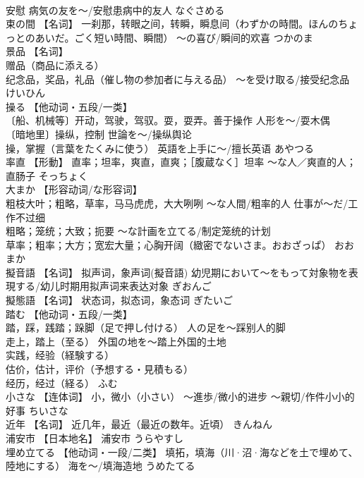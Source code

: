 \documentclass[8pt]{extreport}
\begin{document}
\begin{CJK}{UTF8}{min}
\\	安慰 病気の友を～/安慰患病中的友人	なぐさめる	
\\	束の間	【名词】 一刹那，转眼之间，转瞬，瞬息间（わずかの時間。ほんのちょっとのあいだ。ごく短い時間、瞬間） ～の喜び/瞬间的欢喜	つかのま	
\\	景品	【名词】 
\\	赠品（商品に添える） 
\\	纪念品，奖品，礼品（催し物の参加者に与える品） ～を受け取る/接受纪念品	けいひん	
\\	操る	【他动词・五段/一类】 
\\	〔船、机械等〕开动，驾驶，驾驭。耍，耍弄。善于操作 人形を～/耍木偶 
\\	〔暗地里〕操纵，控制 世論を～/操纵舆论 
\\	操，掌握（言葉をたくみに使う） 英語を上手に～/擅长英语	あやつる	
\\	率直	【形動】 直率；坦率，爽直，直爽；［腹蔵なく］坦率 ～な人／爽直的人；直肠子	そっちょく	
\\	大まか	【形容动词/な形容词】 
\\	粗枝大叶；粗略，草率，马马虎虎，大大咧咧 ～な人間/粗率的人 仕事が～だ/工作不过细 
\\	粗略；笼统；大致；扼要 ～な計画を立てる/制定笼统的计划 
\\	草率；粗率；大方；宽宏大量；心胸开阔（緻密でないさま。おおざっぱ）	おおまか	
\\	擬音語	【名词】 拟声词，象声词(擬音語) 幼児期において～をもって対象物を表現する/幼儿时期用拟声词来表达对象	ぎおんご	
\\	擬態語	【名词】 状态词，拟态词，象态词	ぎたいご	
\\	踏む	【他动词・五段/一类】 
\\	踏，踩，践踏；跺脚（足で押し付ける） 人の足を～踩别人的脚 
\\	走上，踏上（至る） 外国の地を～踏上外国的土地 
\\	实践，经验（経験する） 
\\	估价，估计，评价（予想する・見積もる） 
\\	经历，经过（経る）	ふむ	
\\	小さな	【连体词】 小，微小（小さい） ～進歩/微小的进步 ～親切/作件小小的好事	ちいさな	
\\	近年	【名词】 近几年，最近（最近の数年。近頃）	きんねん	
\\	浦安市	【日本地名】 浦安市	うらやすし	
\\	埋め立てる	【他动词・一段/二类】 填拓，填海（川·沼·海などを土で埋めて、陸地にする） 海を～/填海造地	うめたてる	

\end{CJK}
\end{document}
